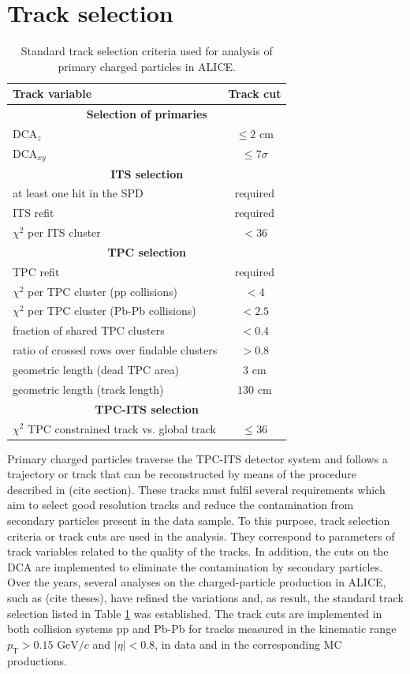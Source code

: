 \documentclass[12pt,a4paper]{report}
\begin{document}
\section{Track selection}
\label{TrackSelection}
\begin{table}[tb!]
\renewcommand{\arraystretch}{1.5}
\centering
\begin{tabular}{l c}
\toprule
\rowcolor{headerBlue}  \textbf{Track variable} &  \textbf{Track cut} \\
\midrule
\multicolumn{2}{c}{\textbf{Selection of primaries}} \\
\midrule
$\text{DCA}_{z}$ & $\leq 2 $ cm\\
$\text{DCA}_{xy}$ & $\leq 7\sigma$ \\
\midrule
\multicolumn{2}{c}{\textbf{ITS selection}} \\
\midrule
at least one hit in the SPD & required \\
ITS refit &  required\\
$\chi^2$ per ITS cluster  & $< 36$ \\
\midrule
\multicolumn{2}{c}{\textbf{TPC selection}} \\
\midrule
TPC refit &  required\\
$\chi^2$ per TPC cluster (pp collisions) & $< 4$ \\
$\chi^2$ per TPC cluster (Pb-Pb collisions) & $< 2.5$ \\
fraction of shared  TPC clusters&  $<  0.4$\\
ratio of crossed rows over findable clusters  & $> 0.8$ \\
geometric length (dead TPC area) & $3$ cm  \\
geometric length (track length) & $130$ cm \\
\midrule
\multicolumn{2}{c}{\textbf{TPC-ITS selection}} \\
\midrule
$\chi^2$ TPC constrained track vs. global track  & $\leq 36$ \\
\bottomrule
\end{tabular}
\caption{Standard track selection criteria used for analysis of primary charged particles in ALICE.}
\label{tab:Cuts}
\end{table}
Primary charged particles traverse the TPC-ITS detector system and follows a trajectory or track that can be reconstructed by means of the procedure described in (cite section). These tracks must fulfil several requirements which aim to select good resolution tracks and reduce the contamination from secondary particles present in the data sample. To this purpose, track selection criteria or track cuts are used in the analysis. They correspond to parameters of track variables related to the quality of the tracks. In addition, the cuts on the $\text{DCA}$ are implemented to eliminate the contamination by secondary particles.\\
Over the years, several analyses on the charged-particle production in ALICE, such as (cite theses), have refined the variations and, as result, the standard track selection listed in Table \ref{tab:Cuts} was established. The track cuts are implemented in both collision systems pp and Pb-Pb for tracks measured in the kinematic range $p_\text{T} > 0.15\text{ GeV}/c$ and $|\eta| < 0.8$, in data and in the corresponding MC productions. 
\iffalse
\end{document}
